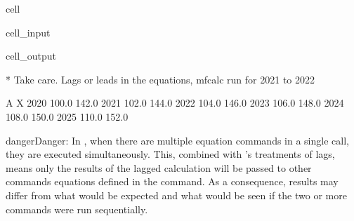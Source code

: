 \documentclass[letterpaper,10pt,english]{jupyterBook}
\begin{document}
\begin{sphinxuseclass}{cell}\begin{sphinxVerbatimInput}

\begin{sphinxuseclass}{cell_input}
\begin{sphinxVerbatim}[commandchars=\\\{\}]
  

  
\end{sphinxVerbatim}

\end{sphinxuseclass}\end{sphinxVerbatimInput}
\begin{sphinxVerbatimOutput}

\begin{sphinxuseclass}{cell_output}
\begin{sphinxVerbatim}[commandchars=\\\{\}]
* Take care. Lags or leads in the equations, mfcalc run for 2021 to 2022
\end{sphinxVerbatim}

\begin{sphinxVerbatim}[commandchars=\\\{\}]
          A      X
2020  100.0  142.0
2021  102.0  144.0
2022  104.0  146.0
2023  106.0  148.0
2024  108.0  150.0
2025  110.0  152.0
\end{sphinxVerbatim}

\end{sphinxuseclass}\end{sphinxVerbatimOutput}

\end{sphinxuseclass}
\begin{sphinxadmonition}{danger}{Danger:}
\sphinxAtStartPar
In , when there are multiple equation commands in a single call, they are executed simultaneously. This, combined with ’s  treatments of lags, means only the results of the lagged calculation will be passed to other commands equations defined in the  command. As a consequence, results may differ from what would be expected and what would be seen if the two or more commands were run sequentially.
\end{sphinxadmonition}
\end{document}
